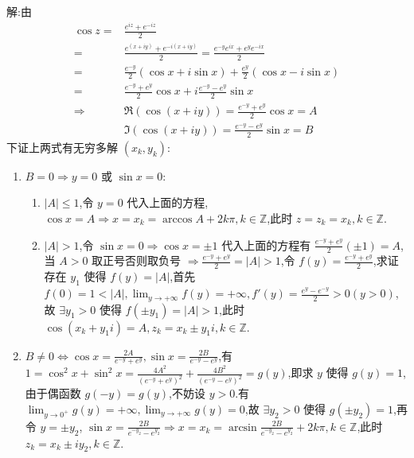 解:由
\begin{align}
    \cos z=&\frac{e^{iz}+e^{-iz}}{2}\nonumber\\
    =&\frac{e^{\left( x+iy \right) }+e^{-i\left( x+iy \right) }}{2}=\frac{e^{-y}e^{ix}+e^{y}e^{-ix}}{2}\nonumber\\
    =&\frac{e^{-y}}{2} \left( \cos x+i \sin x \right) +\frac{e^{y}}{2}\left( \cos x-i\sin x \right)  \nonumber\\
    =&\frac{e^{-y}+e^{y}}{2}\cos x+i \frac{e^{-y}-e^{y}}{2}\sin x\nonumber\\
    \Rightarrow & \Re \left( \cos \left( x+iy \right)  \right) =\frac{e^{-y}+e^{y}}{2}\cos x=A\nonumber\\
                &\Im \left( \cos \left( x+iy \right)  \right) =\frac{e^{-y}-e^{y}}{2}\sin x= B\nonumber
\end{align}
下证上两式有无穷多解 $\left( x_{k},y_{k} \right) $:
\begin{enumerate}
    \item $B=0\Rightarrow y=0$ 或 $\sin x=0$:
        \begin{enumerate}
            \item $|A|\le 1$,令 $y=0$ 代入上面的方程, $\cos x=A\Rightarrow x=x_{k}=\arccos A+2k\pi,k\in \mathbb{Z}$,此时 $z=z_{k}=x_{k},k\in \mathbb{Z}$.
            \item $|A|>1$,令 $\sin x=0\Rightarrow \cos x=\pm 1$ 代入上面的方程有 $\frac{e^{-y}+e^{y}}{2}\left( \pm 1 \right) =A$,当 $A>0$ 取正号否则取负号 $\Rightarrow \frac{e^{-y}+e^{y}}{2}=|A|>1$,令 $f\left( y \right) =\frac{e^{-y}+e^{y}}{2}$,求证存在 $y_1$ 使得 $f\left( y \right) =|A|$,首先 $f\left( 0 \right) =1<|A|,\lim _{y\rightarrow +\infty}f\left( y \right) =+\infty,f'\left( y \right) =\frac{e^{y}-e^{-y}}{2}>0\left( y>0 \right) $,故 $\exists y_{1}>0$ 使得 $f\left( \pm y_1 \right) =|A|>1$,此时 $\cos \left( x_{k}+y_1 i\right) =A,z_{k}=x_{k}\pm y_1 i,k\in \mathbb{Z}$.
        \end{enumerate}
    \item $B\ne 0\Leftrightarrow \cos x=\frac{2A}{e^{-y}+e^{y}},\sin x=\frac{2B}{e^{-y}-e^{y}}$,有 $1=\cos ^2x +\sin ^2 x=\frac{4A^{2}}{\left( e^{-y}+e^{y} \right) ^2}+\frac{4B^2}{\left( e^{-y}-e^{y} \right) ^2}=g\left( y \right) $,即求 $y$ 使得 $g\left( y \right) =1$,由于偶函数 $g\left( -y \right) =g\left( y \right) $,不妨设 $y>0$.有 $\lim _{y\rightarrow 0^{+}}g\left( y \right) =+\infty,\lim_{y\rightarrow +\infty}g\left( y \right) =0$,故 $\exists y_2>0$ 使得 $g\left( \pm y_2 \right) =1$,再令 $y=\pm y_2$, $\sin x=\frac{2B}{e^{-y_2}-e^{y_2}}\Rightarrow x=x_{k}=\arcsin \frac{2B}{e^{-y_2}-e^{y_2}}+2k\pi,k\in \mathbb{Z}$,此时 $z_{k}=x_{k}\pm iy_2,k\in \mathbb{Z}$.
\end{enumerate}

